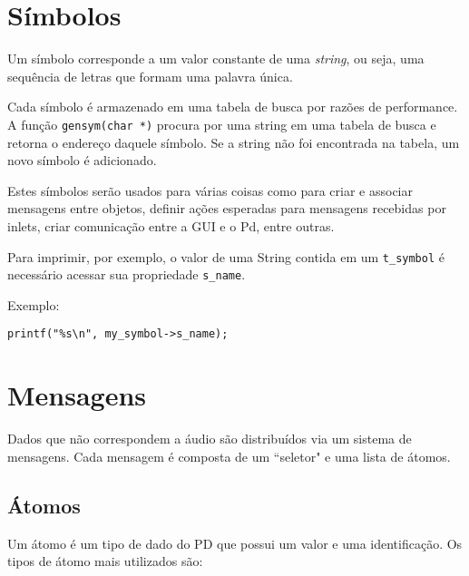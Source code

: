 \section{Símbolos}

Um símbolo corresponde a um valor constante de uma \emph{string}, ou seja,
uma sequência de letras que formam uma palavra única.

Cada símbolo é armazenado em uma tabela de busca por razões de performance. A
função \texttt{gensym(char *)} procura por uma string em uma tabela de busca e
retorna o endereço daquele símbolo. Se a string não foi encontrada na tabela,
um novo símbolo é adicionado.

Estes símbolos serão usados para várias coisas como para criar e associar mensagens 
entre objetos, definir ações esperadas para mensagens recebidas por inlets, criar 
comunicação entre a GUI e o Pd, entre outras.

Para imprimir, por exemplo, o valor de uma String contida em um \texttt{t\_symbol} é
necessário acessar sua propriedade \texttt{s\_name}.

Exemplo:

\begin{lstlisting}[caption=Imprimindo o texto de um símbolo]
   printf("%s\n", my_symbol->s_name);
\end{lstlisting}

\section{Mensagens}
\label{sec:mensagens}

Dados que não correspondem a áudio são distribuídos via um sistema de
mensagens.
Cada mensagem é composta de um ``seletor" e uma lista de átomos.

\subsection{Átomos}
\label{sec:atomos}

Um átomo é um tipo de dado do PD que possui um valor e uma identificação.
Os tipos de átomo mais utilizados são:

